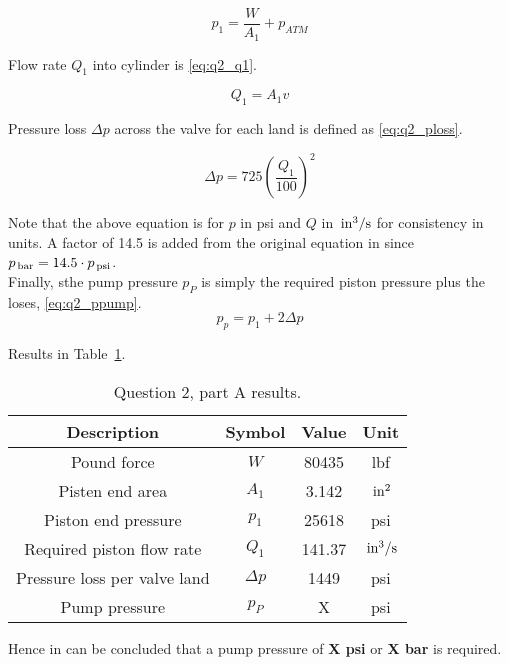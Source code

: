 \begin{equation}
	\label{eq:q2_p1}
	 p_1 = \frac{W}{A_1} + p_{ATM}
\end{equation}

Flow rate $Q_1$ into cylinder is \ref{eq:q2_q1}. 

\begin{equation}
	\label{eq:q2_q1}
	 Q_1 = A_1 v
\end{equation}

Pressure loss $\Delta p$ across the valve for each land is defined as \ref{eq:q2_ploss}.

\begin{equation}
	\label{eq:q2_ploss}
	 \Delta p = 725 \left( \frac{Q_1}{100} \right)^2
\end{equation}

Note that the above equation is for $p$ in psi and $Q$ in $\,\mathrm{in^3/s}$ for consistency in units. A factor of 14.5 is added from the original equation in \cite{assign} since $p_{\,\mathrm{bar}} = 14.5 \cdot p_{\,\mathrm{psi}}$.\\

Finally, sthe pump pressure $p_P$ is simply the required piston pressure plus the loses, \ref{eq:q2_ppump}.
\begin{equation}
	\label{eq:q2_ppump}
	 p_p = p_1 + 2\Delta p
\end{equation}

Results in Table~\ref{tab:q2a_ans}.

\begin{table}[H]
  \centering
  \caption{Question 2, part A results.}
    \begin{tabular}{cccc}
    \toprule
    \textbf{Description} & \textbf{Symbol} & \textbf{Value } & \textbf{Unit} \\
    \midrule
    Pound force & $W$   & 80435 & lbf \\
    Pisten end area & $A_1$ & 3.142 & $\,\mathrm{in^2}$ \\
    Piston end pressure & $p_1$ & 25618 & psi \\
    Required piston flow rate & $Q_1$ & 141.37 & $\,\mathrm{in^3/s}$ \\
    Pressure loss per valve land & $\Delta p$ & 1449  & psi \\
    Pump pressure & $p_P$ & X & psi \\
    \bottomrule
    \end{tabular}
  \label{tab:q2a_ans}
\end{table}%

Hence in can be concluded that a pump pressure of \textbf{X psi} or \textbf{X bar} is required.

